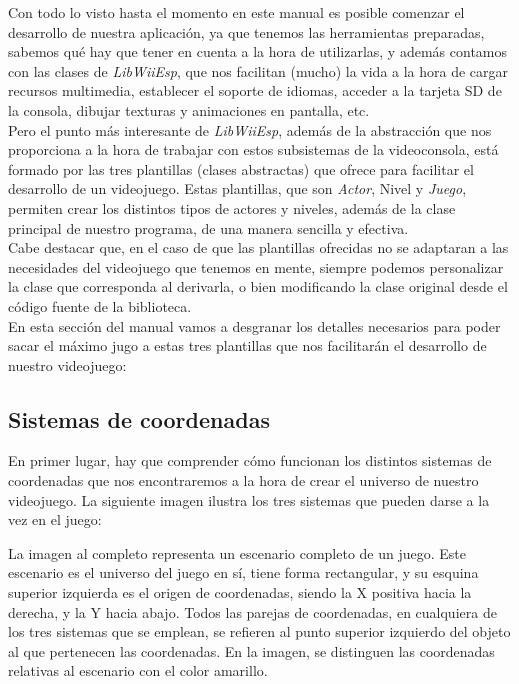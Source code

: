 
Con todo lo visto hasta el momento en este manual es posible comenzar el desarrollo de nuestra aplicación, ya que tenemos las herramientas preparadas, sabemos qué hay que tener en cuenta a la hora de utilizarlas, y además contamos con las clases de \emph{LibWiiEsp}, que nos facilitan (mucho) la vida a la hora de cargar recursos multimedia, establecer el soporte de idiomas, acceder a la tarjeta SD de la consola, dibujar texturas y animaciones en pantalla, etc.\\

Pero el punto más interesante de \emph{LibWiiEsp}, además de la abstracción que nos proporciona a la hora de trabajar con estos subsistemas de la videoconsola, está formado por las tres plantillas (clases abstractas) que ofrece para facilitar el desarrollo de un videojuego. Estas plantillas, que son \emph{Actor}, \emph{}Nivel y \emph{Juego}, permiten crear los distintos tipos de actores y niveles, además de la clase principal de nuestro programa, de una manera sencilla y efectiva.\\

Cabe destacar que, en el caso de que las plantillas ofrecidas no se adaptaran a las necesidades del videojuego que tenemos en mente, siempre podemos personalizar la clase que corresponda al derivarla, o bien modificando la clase original desde el código fuente de la biblioteca.\\

En esta sección del manual vamos a desgranar los detalles necesarios para poder sacar el máximo jugo a estas tres plantillas que nos facilitarán el desarrollo de nuestro videojuego:

\subsection{Sistemas de coordenadas}

En primer lugar, hay que comprender cómo funcionan los distintos sistemas de coordenadas que nos encontraremos a la hora de crear el universo de nuestro videojuego. La siguiente imagen ilustra los tres sistemas que pueden darse a la vez en el juego:


La imagen al completo representa un escenario completo de un juego. Este escenario es el universo del juego en sí, tiene forma rectangular, y su esquina superior izquierda es el origen de coordenadas, siendo la X positiva hacia la derecha, y la Y hacia abajo. Todos las parejas de coordenadas, en cualquiera de los tres sistemas que se emplean, se refieren al punto superior izquierdo del objeto al que pertenecen las coordenadas. En la imagen, se distinguen las coordenadas relativas al escenario con el color amarillo.\\


